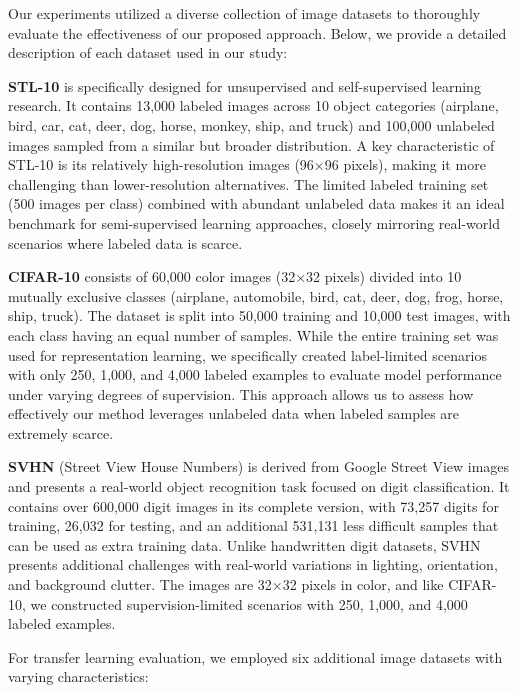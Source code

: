 Our experiments utilized a diverse collection of image datasets to thoroughly evaluate the effectiveness of our proposed approach. Below, we provide a detailed description of each dataset used in our study:

\noindent \textbf{STL-10} \cite{singh2019justification} is specifically designed for unsupervised and self-supervised learning research. It contains 13,000 labeled images across 10 object categories (airplane, bird, car, cat, deer, dog, horse, monkey, ship, and truck) and 100,000 unlabeled images sampled from a similar but broader distribution. A key characteristic of STL-10 is its relatively high-resolution images (96×96 pixels), making it more challenging than lower-resolution alternatives. The limited labeled training set (500 images per class) combined with abundant unlabeled data makes it an ideal benchmark for semi-supervised learning approaches, closely mirroring real-world scenarios where labeled data is scarce.

\noindent \textbf{CIFAR-10} \cite{ho2018cifar10} consists of 60,000 color images (32×32 pixels) divided into 10 mutually exclusive classes (airplane, automobile, bird, cat, deer, dog, frog, horse, ship, truck). The dataset is split into 50,000 training and 10,000 test images, with each class having an equal number of samples. While the entire training set was used for representation learning, we specifically created label-limited scenarios with only 250, 1,000, and 4,000 labeled examples to evaluate model performance under varying degrees of supervision. This approach allows us to assess how effectively our method leverages unlabeled data when labeled samples are extremely scarce.

\noindent \textbf{SVHN} \cite{sermanet2012convolutional} (Street View House Numbers) is derived from Google Street View images and presents a real-world object recognition task focused on digit classification. It contains over 600,000 digit images in its complete version, with 73,257 digits for training, 26,032 for testing, and an additional 531,131 less difficult samples that can be used as extra training data. Unlike handwritten digit datasets, SVHN presents additional challenges with real-world variations in lighting, orientation, and background clutter. The images are 32×32 pixels in color, and like CIFAR-10, we constructed supervision-limited scenarios with 250, 1,000, and 4,000 labeled examples.

For transfer learning evaluation, we employed six additional image datasets with varying characteristics:

